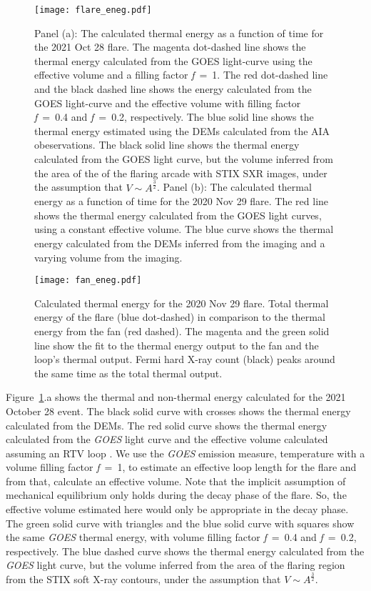 \begin{figure}[ht!]
    \centering
    \texttt{[image: flare\_eneg.pdf]}
    \caption{Panel (a): The calculated thermal energy as a function of time for the 2021 Oct 28 flare. The magenta dot-dashed line shows the thermal energy calculated from the GOES light-curve using the effective volume and a filling factor \textit{f}~=~1. The red dot-dashed line and the black dashed line shows the energy calculated from the GOES light-curve and the effective volume with filling factor \textit{f}~=~0.4 and \textit{f}~=~0.2, respectively. The blue solid line shows the thermal energy estimated using the DEMs calculated from the AIA obeservations. The black solid line shows the thermal energy calculated from the GOES light curve, but the volume inferred from the area of the of the flaring arcade with STIX SXR images, under the assumption that $V\sim A^{\frac{3}{2}}$. Panel (b): The calculated thermal energy as a function of time for the 2020 Nov 29 flare. The red line shows the thermal energy calculated from the GOES light curves, using a constant effective volume. The blue curve shows the thermal energy calculated from the DEMs inferred from the imaging and a varying volume from the imaging.}
    \label{fig:eneg}
\end{figure}

\begin{figure}[ht!]
    \centering
    \texttt{[image: fan\_eneg.pdf]}
    \caption{Calculated thermal energy for the 2020 Nov 29 flare. Total thermal energy of the flare (blue dot-dashed) in comparison to the thermal energy from the fan (red dashed). The magenta and the green solid line show the fit to the thermal energy output to the fan and the loop's thermal output. Fermi hard X-ray count (black) peaks around the same time as the total thermal output.}
    \label{fig:fan_eneg}
    \end{figure}

Figure~\ref{fig:eneg}.a shows the thermal and non-thermal energy calculated for the 2021 October 28 event. The black solid curve with crosses shows the thermal energy calculated from the DEMs. The red solid curve shows the thermal energy calculated from the {\it GOES} light curve and the effective volume calculated assuming an RTV loop \citep{rtv78,serio91}. We use the {\it GOES} emission measure, temperature with a volume filling factor \textit{f}~=~1, to estimate an effective loop length for the flare and from that, calculate an effective volume. Note that the implicit assumption of mechanical equilibrium only holds during the decay phase of the flare. So, the effective volume estimated here would only be appropriate in the decay phase. The green solid curve with triangles and the blue solid curve with squares show the same {\it GOES} thermal energy, with volume filling factor \textit{f}~=~0.4 and \textit{f}~=~0.2, respectively. The blue dashed curve shows the thermal energy calculated from the {\it GOES} light curve, but the volume inferred from the area of the flaring region from the STIX soft X-ray contours, under the assumption that $V\sim A^{\frac{3}{2}}$.

